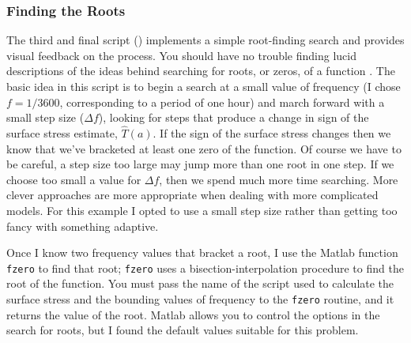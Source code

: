 \documentclass[11pt,titlepage,fleqn]{article}
\begin{document}
\subsubsection*{Finding the Roots}

The third and final script () implements a simple root-finding search and provides visual feedback on the process. You should have no trouble finding lucid descriptions of the ideas behind searching for roots, or zeros, of a function \citep[\eg][]{Press1988}. The basic idea in this script is to begin a search at a small value of frequency (I chose $f = 1/3600$, corresponding to a period of one hour) and march forward with a small step size ($\Delta f$), looking for steps that produce a change in sign of the surface stress estimate, $\hat{T}(a)$. If the sign of the surface stress changes then we know that we’ve bracketed at least one zero of the function. Of course we have to be careful, a step size too large may jump more than one root in one step. If we choose too small a value for $\Delta f$, then we spend much more time searching. More clever approaches are more appropriate when dealing with more complicated models. For this example I opted to use a small step size rather than getting too fancy with something adaptive.

Once I know two frequency values that bracket a root, I use the Matlab function \verb+fzero+ to find that root; \verb+fzero+ uses a bisection-interpolation procedure to find the root of the function. You must pass the name of the script used to calculate the surface stress and the bounding values of frequency to the \verb+fzero+ routine, and it returns the value of the root. Matlab allows you to control the options in the search for roots, but I found the default values suitable for this problem.


\end{document}
